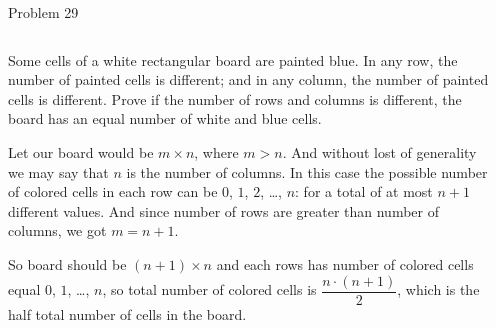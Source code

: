 \documentclass[9pt,aspectratio=169]{beamer}
\begin{document}
\begin{frame}{Problem 29}
  \begin{columns}[T]
    \begin{column}{0.5\textwidth}
      \begin{problem}
        Some cells of a white rectangular board are painted blue. In any row, the number of painted cells is different; and in any column, the number of painted cells is different. Prove if the number of rows and columns is different, the board has an equal number of white and blue cells.
      \end{problem}
      
      Let our board would be $m \times n$, where $m > n$. And without lost of generality we may say that $n$ is the number of columns. In this case the possible number of colored cells in each row can be $0$, $1$, $2$, \ldots, $n$: for a total of at most $n+1$ different values. And since number of rows are greater than number of columns, we got $m = n+1$.

      \smallskip
      So board should be $(n+1) \times n$ and each rows has number of colored cells equal $0$, $1$, \ldots, $n$, so total number of colored cells is $\dfrac{n \cdot (n+1)}{2}$, which is the half total number of cells in the board.
    \end{column}
    \begin{column}{0.5\textwidth}
    \end{column}
  \end{columns}
\end{frame}
\end{document}
